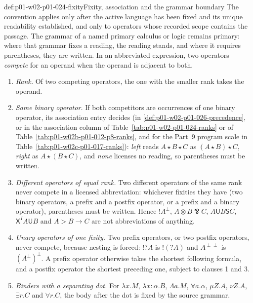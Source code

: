 \begin{hbconvention}{def:p01-w02-p01-024-fixity}{Fixity, association and the grammar boundary}
The convention applies only after the active language has been fixed and
its unique readability established, and only to operators whose recorded
scope contains the passage.  The grammar of a named primary calculus or
logic remains primary: where that grammar fixes a reading, the reading
stands, and where it requires parentheses, they are written.  In an
abbreviated expression, two operators \emph{compete} for an operand when the
operand is adjacent to both.
\begin{enumerate}
\item \emph{Rank.}  Of two competing operators, the one with the smaller
  rank takes the operand.
\item \emph{Same binary operator.}  If both competitors are occurrences of
  one binary operator, its association entry decides (in
  \cref{def:p01-w02-p01-026-precedence}, or in the association column of
  Table~\ref{tab:p01-w02-p01-024-ranks} or of
  Table~\ref{tab:p01-w02b-p01-012-p8-ranks}, and for the Part~9 program
  scale in Table~\ref{tab:p01-w02c-p01-017-ranks}): \emph{left} reads
  \(A\star B\star C\) as \((A\star B)\star C\), \emph{right} as
  \(A\star(B\star C)\), and \emph{none} licenses no reading, so
  parentheses must be written.
\item \emph{Different operators of equal rank.}  Two different operators of
  the same rank never compete in a licensed abbreviation: whichever fixities
  they have (two binary operators, a prefix and a postfix operator, or a
  prefix and a binary operator), parentheses must be written.  Hence
  \(!A^\perp\), \(A\otimes B\bindnasrepma C\), \(A\mathbin{\mathsf U}B
  \mathbin{\mathsf S}C\), \(\mathsf X^{I}A\mathbin{\mathsf U}B\) and
  \(A>B\to C\) are not abbreviations of anything.
\item \emph{Unary operators of one fixity.}  Two prefix operators, or two
  postfix operators, never compete, because nesting is forced:
  \(!?A\) is \(!(?A)\) and \(A^{\perp\perp}\) is \((A^\perp)^\perp\).
  A prefix operator otherwise takes the shortest following formula, and a
  postfix operator the shortest preceding one, subject to clauses 1 and 3.
\item \emph{Binders with a separating dot.}  For
  \(\lambda x.M\), \(\lambda x{:}\alpha.B\), \(\Lambda a.M\),
  \(\forall a.\alpha\), \(\mu Z.A\), \(\nu Z.A\), \(\exists r.C\) and
  \(\forall r.C\), the body after the dot is fixed by the source grammar.

\end{enumerate}
\end{hbconvention}
